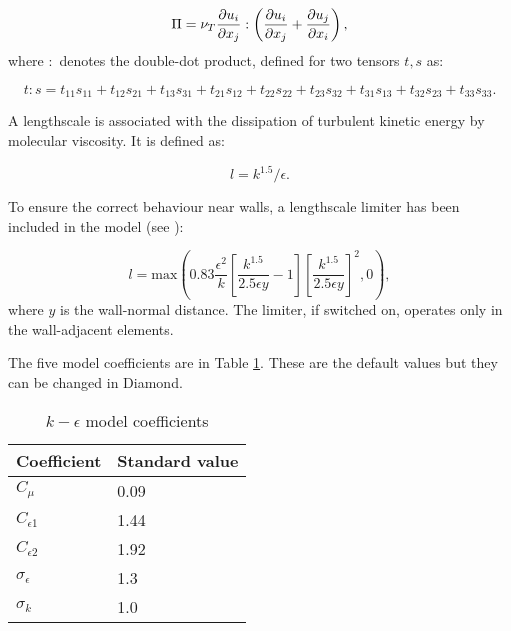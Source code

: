 \begin{equation}\label{Pi2}
\Pi = \nu_T \ppx[x_j]{u_i} : \left ( \ppx[x_j]{u_i} + \ppx[x_i]{u_j} \right ),
\end{equation}
where $:$ denotes the double-dot product, defined for two tensors $t, s$ as:

\begin{equation}\label{doubledot}
t : s = t_{11} s_{11} + t_{12} s_{21} + t_{13} s_{31} + t_{21} s_{12} + t_{22} s_{22} + t_{23} s_{32} + t_{31} s_{13} + t_{32} s_{23} + t_{33} s_{33}.
\end{equation}

A lengthscale is associated with the dissipation of turbulent kinetic energy by molecular viscosity. It is defined as:

\begin{equation}\label{lengthscale}
l = k^{1.5} / \epsilon.
\end{equation}

To ensure the correct behaviour near walls, a lengthscale limiter has been included in the model (see \citet{yap1987, craft1996}):

\begin{equation}\label{yap}
l = \text{max} \left ( 0.83 \frac{\epsilon^2}{k} \left [ \frac{k^{1.5}}{2.5 \epsilon y} -1 \right ] \left [ \frac{k^{1.5}}{2.5 \epsilon y} \right ]^2, 0 \right ),
\end{equation}
where $y$ is the wall-normal distance. The limiter, if switched on, operates only in the wall-adjacent elements.

The five model coefficients are in Table \ref{tab:kepsco}. These are the default values but they can be changed in Diamond.

\begin{table}[hb]
\begin{center} 
\begin{tabular}{ll}\hline
Coefficient & Standard value \\ \hline
$C_\mu$ & 0.09 \\
$C_{\epsilon1}$ & 1.44 \\
$C_{\epsilon2}$ & 1.92 \\
$\sigma_\epsilon$ & 1.3 \\
$\sigma_k$ & 1.0 \\ \hline
\end{tabular}
\end{center}
\caption{$k-\epsilon$ model coefficients}
\label{tab:kepsco}
\end{table}

